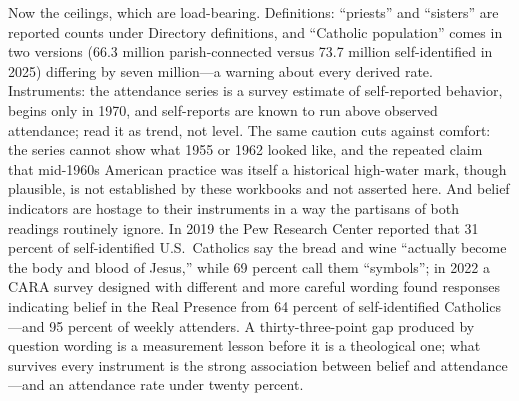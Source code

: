 Now the ceilings, which are load-bearing. Definitions: ``priests'' and ``sisters'' are reported counts under Directory definitions, and ``Catholic population'' comes in two versions (66.3 million parish-connected versus 73.7 million self-identified in 2025) differing by seven million---a warning about every derived rate. Instruments: the attendance series is a survey estimate of self-reported behavior, begins only in 1970, and self-reports are known to run above observed attendance; read it as trend, not level. The same caution cuts against comfort: the series cannot show what 1955 or 1962 looked like, and the repeated claim that mid-1960s American practice was itself a historical high-water mark, though plausible, is not established by these workbooks and not asserted here. And belief indicators are hostage to their instruments in a way the partisans of both readings routinely ignore. In 2019 the Pew Research Center reported that 31 percent of self-identified U.S.\ Catholics say the bread and wine ``actually become the body and blood of Jesus,'' while 69 percent call them ``symbols''; in 2022 a CARA survey designed with different and more careful wording found responses indicating belief in the Real Presence from 64 percent of self-identified Catholics---and 95 percent of weekly attenders. A thirty-three-point gap produced by question wording is a measurement lesson before it is a theological one; what survives every instrument is the strong association between belief and attendance---and an attendance rate under twenty percent.

